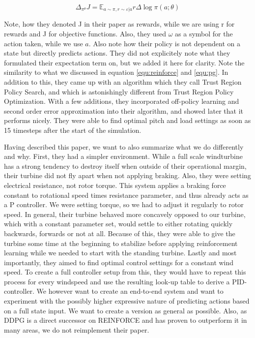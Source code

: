 \documentclass[hyperref,german,beleg]{cgvpub}
\begin{document}
\begin{equation}
\Delta_{\pi^{\theta}} J = \mathbb{E}_{a \sim \pi, r \sim \varepsilon | a} r \Delta \log \pi(a;\theta)
\end{equation}

Note, how they denoted J in their paper as rewards, while we are using r for rewards and J for objective functions. Also, they used $\omega$ as a symbol for the action taken, while we use $a$. Also note how their policy is not dependent on a state but directly predicts actions. They did not explicitely note what they formulated their expectation term on, but we added it here for clarity. Note the similarity to what we discussed in equation \ref{equ:reinforce} and \ref{equ:pg}. In addition to this, they came up with an algorithm which they call Trust Region Policy Search, and which is astonishingly different from Trust Region Policy Optimization. With a few additions, they incorporated off-policy learning and second order error approximation into their algorithm, and showed later that it performs nicely. They were able to find optimal pitch and load settings as soon as 15 timesteps after the start of the simulation.

Having described this paper, we want to also summarize what we do differently and why. First, they had a simpler environment. While a full scale windturbine has a strong tendency to destroy itself when outside of their operational margin, their turbine did not fly apart when not applying braking. Also, they were setting electrical resistance, not rotor torque. This system applies a braking force constant to rotational speed times resistance parameter, and thus already acts as a P controller. We were setting torque, so we had to adjust it regularly to rotor speed. In general, their turbine behaved more concavely opposed to our turbine, which with a constant parameter set, would settle to either rotating quickly backwards, forwards or not at all. Because of this, they were able to give the turbine some time at the beginning to stabilize before applying reinforcement learning while we needed to start with the standing turbine. Lastly and most importantly, they aimed to find optimal control settings for a constant wind speed. To create a full controller setup from this, they would have to repeat this process for every windspeed and use the resulting look-up table to derive a PID-controller. We however want to create an end-to-end system and want to experiment with the possibly higher expressive nature of predicting actions based on a full state input. We want to create a version as general as possible. Also, as \ac{DDPG} is a direct successor on \ac{REINFORCE} and has proven to outperform it in many areas, we do not reimplement their paper.
\end{document}
